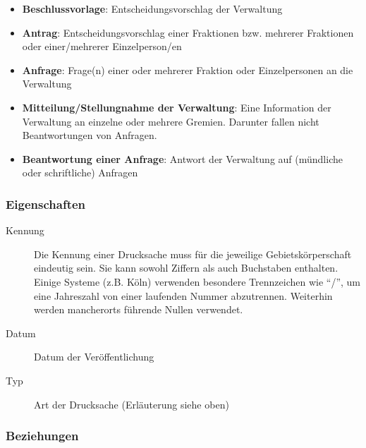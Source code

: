 \documentclass[,a4paper]{article}
\begin{document}
\begin{itemize}
\item
  \textbf{Beschlussvorlage}: Entscheidungsvorschlag der Verwaltung
\item
  \textbf{Antrag}: Entscheidungsvorschlag einer Fraktionen bzw. mehrerer
  Fraktionen oder einer/mehrerer Einzelperson/en
\item
  \textbf{Anfrage}: Frage(n) einer oder mehrerer Fraktion oder
  Einzelpersonen an die Verwaltung
\item
  \textbf{Mitteilung/Stellungnahme der Verwaltung}: Eine Information der
  Verwaltung an einzelne oder mehrere Gremien. Darunter fallen nicht
  Beantwortungen von Anfragen.
\item
  \textbf{Beantwortung einer Anfrage}: Antwort der Verwaltung auf
  (mündliche oder schriftliche) Anfragen
\end{itemize}

\subsubsection{Eigenschaften}

\begin{description}
\item[Kennung]
Die Kennung einer Drucksache muss für die jeweilige Gebietskörperschaft
eindeutig sein. Sie kann sowohl Ziffern als auch Buchstaben enthalten.
Einige Systeme (z.B. Köln) verwenden besondere Trennzeichen wie ``/'',
um eine Jahreszahl von einer laufenden Nummer abzutrennen. Weiterhin
werden mancherorts führende Nullen verwendet.
\item[Datum]
Datum der Veröffentlichung
\item[Typ]
Art der Drucksache (Erläuterung siehe oben)
\end{description}

\subsubsection{Beziehungen}
\end{document}
